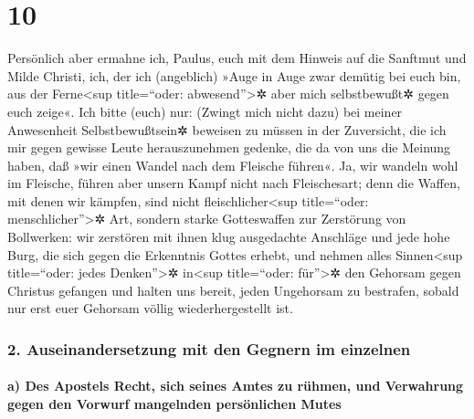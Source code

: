 \hypertarget{section-9}{%
\section{10}\label{section-9}}

 Persönlich aber ermahne ich, Paulus, euch mit dem Hinweis
auf die Sanftmut und Milde Christi, ich, der ich (angeblich) »Auge in
Auge zwar demütig bei euch bin, aus der Ferne\textless sup title=``oder:
abwesend''\textgreater✲ aber mich selbstbewußt✲ gegen euch zeige«.
 Ich bitte (euch) nur: (Zwingt mich nicht dazu) bei meiner
Anwesenheit Selbstbewußtsein✲ beweisen zu müssen in der Zuversicht, die
ich mir gegen gewisse Leute herauszunehmen gedenke, die da von uns die
Meinung haben, daß »wir einen Wandel nach dem Fleische führen«.
 Ja, wir wandeln wohl im Fleische, führen aber unsern
Kampf nicht nach Fleischesart;  denn die Waffen, mit denen
wir kämpfen, sind nicht fleischlicher\textless sup title=``oder:
menschlicher''\textgreater✲ Art, sondern starke Gotteswaffen zur
Zerstörung von Bollwerken: wir zerstören mit ihnen klug ausgedachte
Anschläge  und jede hohe Burg, die sich gegen die
Erkenntnis Gottes erhebt, und nehmen alles Sinnen\textless sup
title=``oder: jedes Denken''\textgreater✲ in\textless sup title=``oder:
für''\textgreater✲ den Gehorsam gegen Christus gefangen 
und halten uns bereit, jeden Ungehorsam zu bestrafen, sobald nur erst
euer Gehorsam völlig wiederhergestellt ist.

\hypertarget{auseinandersetzung-mit-den-gegnern-im-einzelnen}{%
\subsubsection{2. Auseinandersetzung mit den Gegnern im
einzelnen}\label{auseinandersetzung-mit-den-gegnern-im-einzelnen}}

\hypertarget{a-des-apostels-recht-sich-seines-amtes-zu-ruxfchmen-und-verwahrung-gegen-den-vorwurf-mangelnden-persuxf6nlichen-mutes}{%
\paragraph{a) Des Apostels Recht, sich seines Amtes zu rühmen, und
Verwahrung gegen den Vorwurf mangelnden persönlichen
Mutes}\label{a-des-apostels-recht-sich-seines-amtes-zu-ruxfchmen-und-verwahrung-gegen-den-vorwurf-mangelnden-persuxf6nlichen-mutes}}

